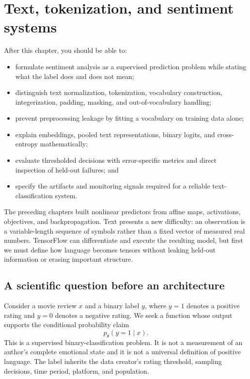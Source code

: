 \chapter{Text, tokenization, and sentiment systems}
\label{ch:text-sentiment}

\begin{learningobjectives}
After this chapter, you should be able to:
\begin{itemize}
  \item formulate sentiment analysis as a supervised prediction problem while
  stating what the label does and does not mean;
  \item distinguish text normalization, tokenization, vocabulary construction,
  integerization, padding, masking, and out-of-vocabulary handling;
  \item prevent preprocessing leakage by fitting a vocabulary on training data
  alone;
  \item explain embeddings, pooled text representations, binary logits, and
  cross-entropy mathematically;
  \item evaluate thresholded decisions with error-specific metrics and direct
  inspection of held-out failures; and
  \item specify the artifacts and monitoring signals required for a reliable
  text-classification system.
\end{itemize}
\end{learningobjectives}

\begin{chapterconnection}
The preceding chapters built nonlinear predictors from affine maps,
activations, objectives, and backpropagation. Text presents a new difficulty:
an observation is a variable-length sequence of symbols rather than a fixed
vector of measured real numbers. TensorFlow can differentiate and execute the
resulting model, but first we must define how language becomes tensors without
leaking held-out information or erasing important structure.
\end{chapterconnection}

\section{A scientific question before an architecture}

Consider a movie review $x$ and a binary label $y$, where $y=1$ denotes a
positive rating and $y=0$ denotes a negative rating. We seek a function whose
output supports the conditional probability claim
\[
  p_\theta(y=1\mid x).
\]
This is a supervised binary-classification problem. It is not a measurement of
an author's complete emotional state and it is not a universal definition of
positive language. The label inherits the data creator's rating threshold,
sampling decisions, time period, platform, and population.

